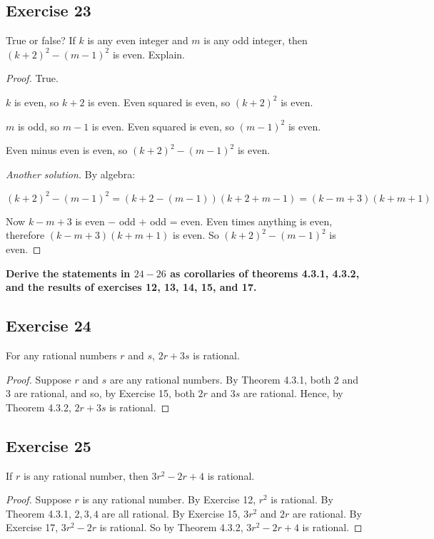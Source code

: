 \documentclass[14pt]{extarticle}
\newcommand{\cy}{\color{cyan}}
\begin{document}
\subsection{Exercise 23}
True or false? If $k$ is any even integer and $m$ is any
odd integer, then $(k + 2)^2 - (m - 1)^2$ is even. Explain.

\begin{proof}
    True.

    $k$ is even, so $k+2$ is even. Even squared is even, so $(k + 2)^2$ is even.

    $m$ is odd, so $m-1$ is even. Even squared is even, so $(m - 1)^2$ is even.

    Even minus even is even, so $(k + 2)^2 - (m - 1)^2$ is even.

        {\it Another solution.} By algebra:

    $(k + 2)^2 - (m - 1)^2 = (k+2-(m-1))(k+2+m-1) = (k-m+3)(k+m+1)$

    Now $k-m+3$ is even $-$ odd $+$ odd = even. Even times anything is even, therefore $(k-m+3)(k+m+1)$ is even. So $(k + 2)^2 - (m - 1)^2$ is even.
\end{proof}

{\bf \cy Derive the statements in $24-26$ as corollaries of theorems 4.3.1, 4.3.2, and the results of exercises 12, 13, 14, 15, and 17.}

\subsection{Exercise 24}
For any rational numbers $r$ and $s$, $2r + 3s$ is rational.

\begin{proof}
    Suppose $r$ and $s$ are any rational numbers. By Theorem 4.3.1, both 2 and 3 are rational, and so, by Exercise 15, both $2r$ and $3s$ are rational. Hence, by Theorem 4.3.2, $2r + 3s$ is rational.
\end{proof}

\subsection{Exercise 25}
If $r$ is any rational number, then $3r^2 - 2r + 4$ is
rational.

\begin{proof}
    Suppose $r$ is any rational number. By Exercise 12, $r^2$ is rational. By Theorem 4.3.1, $2, 3,4$ are all rational. By Exercise 15, $3r^2$ and $2r$ are rational. By Exercise 17, $3r^2-2r$ is rational. So by Theorem 4.3.2, $3r^2-2r+4$ is rational.
\end{proof}
\end{document}
